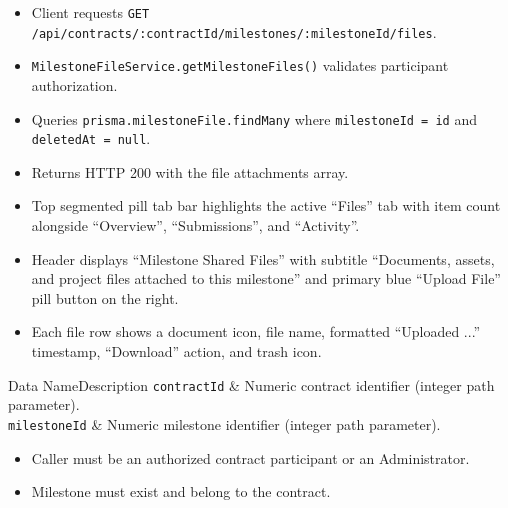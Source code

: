 \begin{itemize}[leftmargin=1.6em,topsep=3pt,itemsep=2pt,parsep=0pt,label=$\bullet$]
      \item Client requests \texttt{GET /\allowbreak{}api/\allowbreak{}contracts/\allowbreak{}:\allowbreak{}contractId/\allowbreak{}milestones/\allowbreak{}:\allowbreak{}milestoneId/\allowbreak{}files}.
      \item \texttt{MilestoneFileService.getMilestoneFiles()} validates participant authorization.
      \item Queries \texttt{prisma.milestoneFile.findMany} where \texttt{milestoneId = id} and \texttt{deletedAt = null}.
      \item Returns HTTP 200 with the file attachments array.
\end{itemize}

\begin{itemize}[leftmargin=1.6em,topsep=3pt,itemsep=2pt,parsep=0pt,label=$\bullet$]
      \item Top segmented pill tab bar highlights the active ``Files'' tab with item count alongside ``Overview'', ``Submissions'', and ``Activity''.
      \item Header displays ``Milestone Shared Files'' with subtitle ``Documents, assets, and project files attached to this milestone'' and primary blue ``Upload File'' pill button on the right.
      \item Each file row shows a document icon, file name, formatted ``Uploaded ...'' timestamp, ``Download'' action, and trash icon.
\end{itemize}


\begin{specdatatable}{Data Name}{Description}
      \texttt{contractId} & Numeric contract identifier (integer path parameter).\\ \hline
      \texttt{milestoneId} & Numeric milestone identifier (integer path parameter).\\ \hline
\end{specdatatable}

\begin{itemize}[leftmargin=1.6em,topsep=3pt,itemsep=2pt,parsep=0pt,label=$\bullet$]
      \item Caller must be an authorized contract participant or an Administrator.
      \item Milestone must exist and belong to the contract.
\end{itemize}

